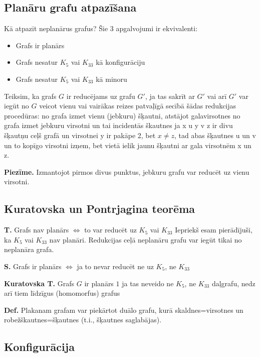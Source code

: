 \documentclass{article}
\begin{document}
\subsection{Planāru grafu atpazīšana}

Kā atpazīt neplanārus grafus?
Šie 3 apgalvojumi ir ekvivalenti:
\begin{itemize}
	\item Grafs ir planārs
	\item Grafs nesatur $K_5$ vai $K_{33}$ kā konfigurāciju
	\item Grafs nesatur $K_5$ vai $K_{33}$ kā minoru
\end{itemize}

Teiksim, ka grafs $ G $ ir reducējams uz grafu $ G' $, ja tas sakrīt ar $ G' $ vai arī $ G' $ var iegūt no $ G $ veicot vienu vai vairākas reizes patvaļīgā secībā šādas redukcijas procedūras: no grafa izmet vienu (jebkuru) šķautni, atstājot galavirsotnes no grafa izmet jebkuru virsotni un tai incidentās škautnes ja x u y v z ir divu šķautņu ceļš grafā un virsotnei y ir pakāpe 2, bet $x \ne z$, tad abas šķautnes u un v un to kopīgo virsotni izņem, bet vietā ielik jaunu šķautni ar gala virsotnēm x un z.

\textbf{Piezīme.} Izmantojot pirmos divus punktus, jebkuru grafu var reducēt uz vienu virsotni.

\subsection{Kuratovska un Pontrjagina teorēma}

\textbf{T.}  Grafs nav planārs $\Leftrightarrow$ to var reducēt uz $K_5$ vai $K_{33}$ Iepriekš esam pierādījuši, ka $K_5$ vai $K_{33}$ nav planāri.  Redukcijas ceļā neplanāru grafu var iegūt tikai no neplanāra grafa.

\textbf{S. } Grafs ir planārs $\Leftrightarrow$ ja to nevar reducēt ne uz $K_5$, ne $K_{33}$

\textbf{Kuratovska T.} Grafs $ G $ ir planārs $1$ ja tas neveido ne $K_5$, ne $K_{33}$ daļgrafu, nedz arī tiem līdzīgus (homomorfus) grafus

\textbf{Def.}  Plakanam grafam var piekārtot duālo grafu, kurā skaldnes=virsotnes un robežškautnes=šķautnes (t.i., šķautnes saglabājas).

\subsection{Konfigurācija}
\end{document}
